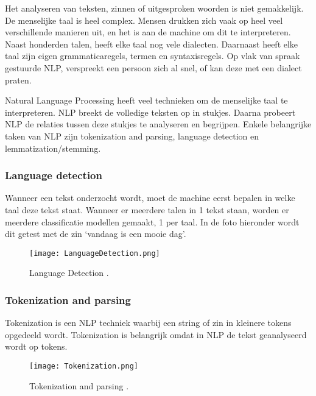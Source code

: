 Het analyseren van teksten, zinnen of uitgesproken woorden is niet gemakkelijk. De menselijke taal is heel complex. Mensen drukken zich vaak op heel veel verschillende manieren uit, en het is aan de machine om dit te interpreteren. Naast honderden talen, heeft elke taal nog vele dialecten. Daarnaast heeft elke taal zijn eigen grammaticaregels, termen en syntaxisregels.
Op vlak van spraak gestuurde NLP, verspreekt een persoon zich al snel, of kan deze met een dialect praten. \autocite{sas2020}

Natural Language Processing heeft veel technieken om de menselijke taal te interpreteren. NLP breekt de volledige teksten op in stukjes. Daarna probeert NLP de relaties tussen deze stukjes te analyseren en begrijpen. Enkele belangrijke taken van NLP zijn tokenization and parsing, language detection en lemmatization/stemming. \autocite{sas2020}

\subsubsection{Language detection}
\label{sec:Languagedetection}

Wanneer een tekst onderzocht wordt, moet de machine eerst bepalen in welke taal deze tekst staat. Wanneer er meerdere talen in 1 tekst staan, worden er meerdere classificatie modellen gemaakt, 1 per taal. In de foto hieronder wordt dit getest met de zin ‘vandaag is een mooie dag’. 

\begin{figure}[!htbp]
    \texttt{[image: LanguageDetection.png]}
    \caption{\label{languagedetection}Language Detection \autocite{sas2020}.}
\end{figure}
\FloatBarrier

\subsubsection{Tokenization and parsing}
\label{sec:Tokenization}

Tokenization is een NLP techniek waarbij een string of zin in kleinere tokens opgedeeld wordt. Tokenization is belangrijk omdat in NLP de tekst geanalyseerd wordt op tokens. 

\begin{figure}[!htbp]
    \texttt{[image: Tokenization.png]}
    \caption{\label{tokenization}Tokenization and parsing \autocite{sas2020}.}
\end{figure}
\FloatBarrier

